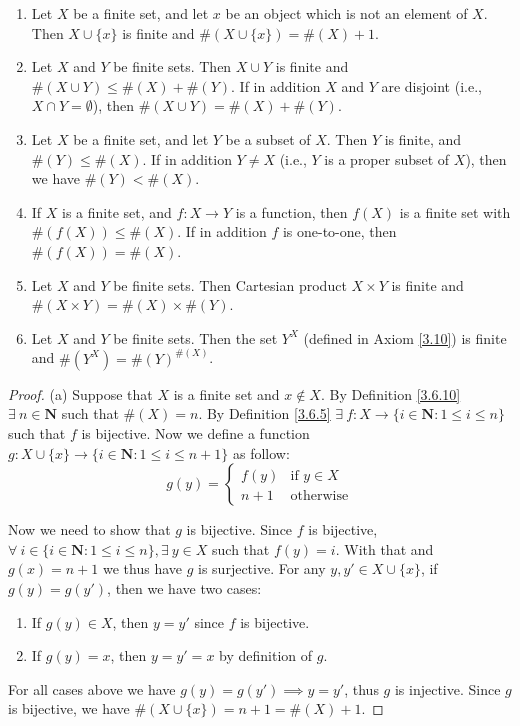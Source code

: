 \begin{proposition}\label{3.6.14}
\leavevmode
\begin{enumerate}
    \item Let \(X\) be a finite set, and let \(x\) be an object which is not an element of \(X\).
    Then \(X \cup \{x\}\) is finite and \(\#(X \cup \{x\}) = \#(X) + 1\).
    \item Let \(X\) and \(Y\) be finite sets.
    Then \(X \cup Y\) is finite and \(\#(X \cup Y) \leq \#(X) + \#(Y)\).
    If in addition \(X\) and \(Y\) are disjoint (i.e., \(X \cap Y = \emptyset\)), then \(\#(X \cup Y) = \#(X) + \#(Y)\).
    \item Let \(X\) be a finite set, and let \(Y\) be a subset of \(X\).
    Then \(Y\) is finite, and \(\#(Y) \leq \#(X)\).
    If in addition \(Y \neq X\) (i.e., \(Y\) is a proper subset of \(X\)), then we have \(\#(Y) < \#(X)\).
    \item If \(X\) is a finite set, and \(f : X \to Y\) is a function, then \(f(X)\) is a finite set with \(\#(f(X)) \leq \#(X)\).
    If in addition \(f\) is one-to-one, then \(\#(f(X)) = \#(X)\).
    \item Let \(X\) and \(Y\) be finite sets.
    Then Cartesian product \(X \times Y\) is finite and \(\#(X \times Y) = \#(X) \times \#(Y)\).
    \item Let \(X\) and \(Y\) be finite sets.
    Then the set \(Y^X\) (defined in Axiom \ref{3.10}) is finite and \(\#(Y^X) = \#(Y)^{\#(X)}\).
\end{enumerate}
\end{proposition}

\begin{proof}{(a)}
Suppose that \(X\) is a finite set and \(x \notin X\).
By Definition \ref{3.6.10} \(\exists\ n \in \mathbf{N}\) such that \(\#(X) = n\).
By Definition \ref{3.6.5} \(\exists\ f : X \to \{i \in \mathbf{N} : 1 \leq i \leq n\}\) such that \(f\) is bijective.
Now we define a function \(g : X \cup \{x\} \to \{i \in \mathbf{N} : 1 \leq i \leq n + 1\}\) as follow:
\[
    g(y) = \begin{cases}
        f(y) & \text{if } y \in X \\
        n + 1 & \text{otherwise}
    \end{cases}
\]

Now we need to show that \(g\) is bijective.
Since \(f\) is bijective, \(\forall\ i \in \{i \in \mathbf{N} : 1 \leq i \leq n\}, \exists\ y \in X\) such that \(f(y) = i\).
With that and \(g(x) = n + 1\) we thus have \(g\) is surjective.
For any \(y, y' \in X \cup \{x\}\), if \(g(y) = g(y')\), then we have two cases:
\begin{enumerate}[label=(\roman*)]
    \item If \(g(y) \in X\), then \(y = y'\) since \(f\) is bijective.
    \item If \(g(y) = x\), then \(y = y' = x\) by definition of \(g\).
\end{enumerate}
For all cases above we have \(g(y) = g(y') \implies y = y'\), thus \(g\) is injective.
Since \(g\) is bijective, we have \(\#(X \cup \{x\}) = n + 1 = \#(X) + 1\).
\end{proof}

